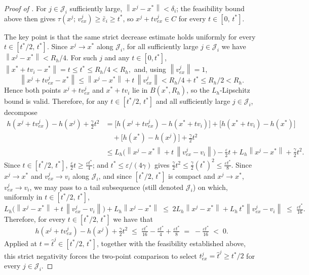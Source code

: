 \documentclass[10pt,a4paper]{amsart}
\newcommand{\norm}[1]{\left\|#1\right\|}
\begin{document}
\begin{proof}[Proof of ]
For $j \in \mathcal{J}_i$ sufficiently large, $\norm{x^j - x^*} < \delta_i$; the feasibility bound above then gives $\tau(x^j;\, v^j_{ex}) \geq \bar{\varepsilon}_i \geq t^*$, so $x^j + t v^j_{ex} \in C$ for every $t \in [0,\, t^*]$.



The key point is that the same strict decrease estimate holds uniformly for every $t \in [t^*/2,\, t^*]$. 
Since $x^j \to x^*$ along $\mathcal{J}_i$, for all sufficiently large $j \in \mathcal{J}_i$ we have $\norm{x^j-x^*}<R_h/4$. For such $j$ and any $t\in[0,t^*]$, $\norm{x^*+t v_i-x^*}=t\le t^*\le R_h/4<R_h,$
and, using $\norm{v_{ex}^j}=1$,
\[
\norm{x^j+t v_{ex}^j-x^*}\le \norm{x^j-x^*}+t\,\norm{v_{ex}^j}
<R_h/4+t^*\le R_h/2<R_h.
\]
Hence both points $x^j+t v_{ex}^j$ and $x^*+t v_i$ lie in $B(x^*,R_h)$, so the $L_h$-Lipschitz bound is valid. Therefore, for any $t \in [t^*/2,\, t^*]$ and all sufficiently large $j \in \mathcal{J}_i$, decompose
\begin{align*}
  h(x^j + t v^j_{ex}) - h(x^j) + \tfrac{\gamma}{2}t^2
  &= \bigl[h(x^j + t v^j_{ex}) - h(x^* + t v_i)\bigr]
   + \bigl[h(x^* + t v_i) - h(x^*)\bigr] \\
  &\quad + \bigl[h(x^*) - h(x^j)\bigr] + \tfrac{\gamma}{2}t^2 \\
  &\leq L_h\bigl(\norm{x^j - x^*} + t\,\norm{v^j_{ex} - v_i}\bigr)
     - \tfrac{\varepsilon}{2}t
     + L_h\norm{x^j - x^*}
     + \tfrac{\gamma}{2}t^2.
\end{align*}
Since $t \in [t^*/2,\, t^*]$, $\tfrac{\varepsilon}{2}t \geq \tfrac{\varepsilon t^*}{4}$; and $t^* \leq \varepsilon/(4\gamma)$ gives $\tfrac{\gamma}{2}t^2 \leq \tfrac{\gamma}{2}(t^*)^2 \leq \tfrac{\varepsilon t^*}{8}$. 
Since $x^j \to x^*$ and $v^j_{ex} \to v_i$ along $\mathcal{J}_i$, and since $[t^*/2,\, t^*]$ is compact and $x^j \to x^*$, $v^j_{ex} \to v_i$, we may pass to a tail subsequence (still denoted $\mathcal{J}_i$) on which, uniformly in $t \in [t^*/2,\, t^*]$,
\[
  L_h\bigl(\norm{x^j - x^*} + t\,\norm{v^j_{ex} - v_i}\bigr) + L_h\norm{x^j - x^*}
  \;\leq\; 2 L_h\norm{x^j - x^*} + L_h\, t^*\norm{v^j_{ex} - v_i}
  \;\leq\; \tfrac{\varepsilon t^*}{16}.
\]
Therefore, for every $t \in [t^*/2,\, t^*]$ we have that
\[
  h(x^j + t v^j_{ex}) - h(x^j) + \tfrac{\gamma}{2}t^2
  \;\leq\; \tfrac{\varepsilon t^*}{16} - \tfrac{\varepsilon t^*}{4} + \tfrac{\varepsilon t^*}{8}
  \;=\; -\tfrac{\varepsilon t^*}{16} \;<\; 0.
\]
Applied at $t = \hat{t}^j \in [t^*/2,\, t^*]$, together with the feasibility established above, this strict negativity forces the two-point comparison to select $t^j_{ex} = \hat{t}^j \geq t^*/2$ for every $j \in \mathcal{J}_i$.



\end{proof}
\end{document}
